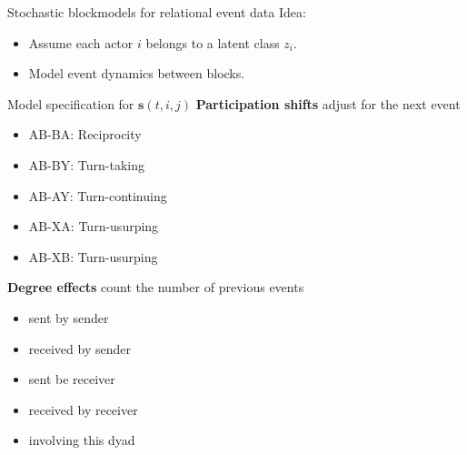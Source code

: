 \documentclass{beamer}
\begin{document}
\begin{frame}{Stochastic blockmodels for relational event data}
Idea: 
  \begin{itemize}
  \item Assume each actor $i$ belongs to a latent class $z_i$.
  \item Model event dynamics between blocks.
  \end{itemize}


\end{frame}

\begin{frame}{Model specification for $\mathbf{s}(t,i,j)$}
\textbf{Participation shifts} adjust for the next event
\begin{itemize}
\item AB-BA: Reciprocity
\item AB-BY:  Turn-taking 
\item AB-AY: Turn-continuing
\item AB-XA: Turn-usurping
\item AB-XB: Turn-usurping
\end{itemize}

\textbf{Degree effects} count the number of previous events
\begin{itemize}
\item sent by sender
\item received by sender
\item sent be receiver
\item received by receiver
\item involving this dyad
\end{itemize}

\end{frame}
\end{document}
